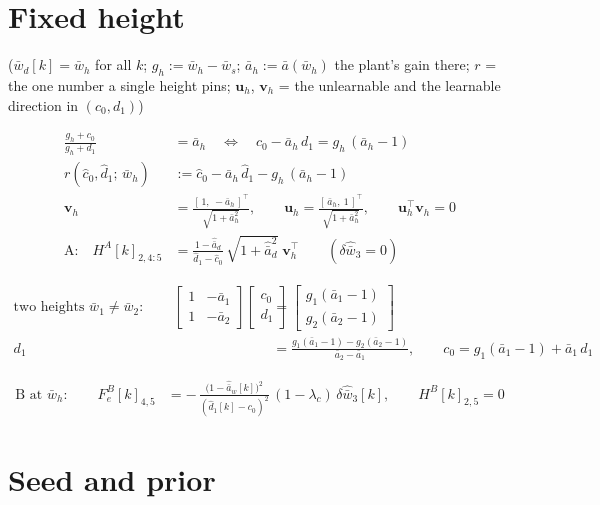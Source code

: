 \documentclass[11pt,a4paper,fontset=none]{ctexart}
\newcommand{\ba}{\bar{a}}
\newcommand{\bw}{\bar{w}}
\newcommand{\ah}{\hat{\ba}_w}
\newcommand{\ch}{\hat{c}_0}
\newcommand{\dhat}{\hat{d}_1}
\newcommand{\ad}{\hat{\ba}_d}
\begin{document}
\section{Fixed height}

($\bw_d[k] = \bw_h$ for all $k$; $g_h := \bw_h - \bw_s$; $\ba_h := \ba(\bw_h)$ the plant's gain there;
$r$ = the one number a single height pins; $\mathbf{u}_h$, $\mathbf{v}_h$ = the unlearnable and the learnable direction in $(c_0, d_1)$)

\begin{align*}
\frac{g_h + c_0}{g_h + d_1} &= \ba_h
\quad\Longleftrightarrow\quad
c_0 - \ba_h\,d_1 = g_h\,(\ba_h - 1) \\[4pt]
r(\ch, \dhat;\, \bw_h) &:= \ch - \ba_h\,\dhat - g_h\,(\ba_h - 1) \\[4pt]
\mathbf{v}_h &= \frac{[\,1,\ -\ba_h\,]^{\top}}{\sqrt{1+\ba_h^{2}}}, \qquad
\mathbf{u}_h = \frac{[\,\ba_h,\ 1\,]^{\top}}{\sqrt{1+\ba_h^{2}}}, \qquad
\mathbf{u}_h^{\top}\mathbf{v}_h = 0 \\[4pt]
\text{A:}\quad H^{A}[k]_{2,4:5} &= \frac{1-\ad}{\dhat - \ch}\,\sqrt{1+\ad^{2}}\;\mathbf{v}_h^{\top}
\qquad (\delta\hat{\bw}_3 = 0)
\end{align*}

\begin{align*}
\text{two heights } \bw_1 \ne \bw_2:\qquad
\begin{bmatrix} 1 & -\ba_1 \\ 1 & -\ba_2 \end{bmatrix}
\begin{bmatrix} c_0 \\ d_1 \end{bmatrix}
&= \begin{bmatrix} g_1(\ba_1 - 1) \\ g_2(\ba_2 - 1) \end{bmatrix} \\[4pt]
d_1 &= \frac{g_1(\ba_1 - 1) - g_2(\ba_2 - 1)}{\ba_2 - \ba_1}, \qquad
c_0 = g_1(\ba_1 - 1) + \ba_1\,d_1
\end{align*}

\begin{align*}
\text{B at } \bw_h:\qquad
F_e^{B}[k]_{4,5} &= -\,\frac{\bigl(1-\ah[k]\bigr)^{2}}{(\dhat[k] - c_0)^{2}}\,(1-\lambda_c)\,\delta\hat{\bw}_3[k], \qquad
H^{B}[k]_{2,5} = 0
\end{align*}

\section*{Seed and prior}
\end{document}
